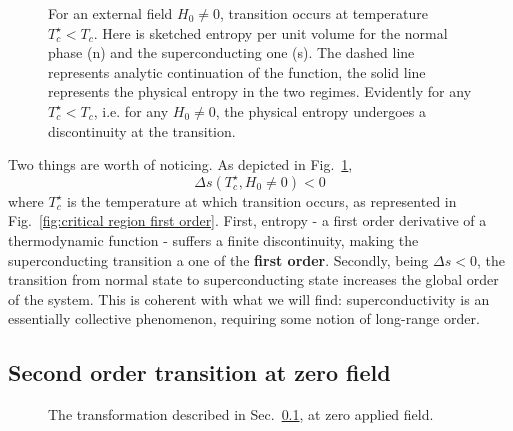 \begin{figure}
    \centering
    
    \caption{For an external field $H_0\neq 0$, transition occurs at temperature $T_c^\star < T_c$. Here is sketched entropy per unit volume for the normal phase (n) and the superconducting one (s). The dashed line represents analytic continuation of the function, the solid line represents the physical entropy in the two regimes. Evidently for any $T_c^\star < T_c$, i.e. for any $H_0 \neq 0$, the physical entropy undergoes a discontinuity at the transition.}
    \label{fig:first order transition entropy}
\end{figure}

Two things are worth of noticing. As depicted in Fig.~\ref{fig:first order transition entropy},
\[
    \Delta s (T_c^\star, H_0 \neq 0) < 0
\]
where $T_c^\star$ is the temperature at which transition occurs, as represented in Fig.~\ref{fig:critical region first order}. First, entropy - a first order derivative of a thermodynamic function - suffers a finite discontinuity, making the superconducting transition a one of the \textbf{first order}. Secondly, being $\Delta s < 0$, the transition from normal state to superconducting state increases the global order of the system. This is coherent with what we will find: superconductivity is an essentially collective phenomenon, requiring some notion of long-range order.

\subsection{Second order transition at zero field}\label{sec:second order transition}

\begin{figure}
    \centering
    
    \caption{The transformation described in Sec.~\ref{sec:second order transition}, at zero applied field.}
    \label{fig:critical region second order}
\end{figure}

